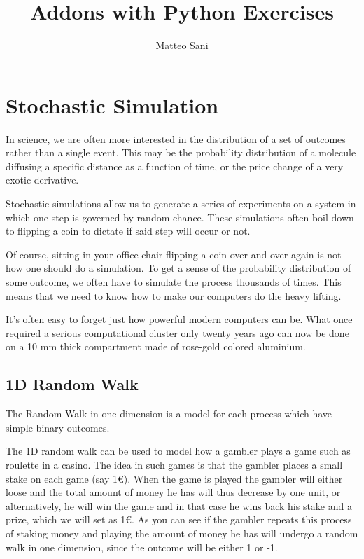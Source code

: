 \documentclass[12pt,a4paper]{article}
\title{Addons with Python Exercises}
\author{Matteo Sani}
\begin{document}
\maketitle

\section{Stochastic Simulation}
In science, we are often more interested in the distribution of a set of outcomes rather than a single event. This may be the probability distribution of a molecule diffusing a specific distance as a function of time, or the price change of a very exotic derivative.

Stochastic simulations allow us to generate a series of experiments on a system in which one step is governed by random chance. These simulations often boil down to flipping a coin to dictate if said step will occur or not.

Of course, sitting in your office chair flipping a coin over and over again is not how one should do a simulation. To get a sense of the probability distribution of some outcome, we often have to simulate the process thousands of times. This means that we need to know how to make our computers do the heavy lifting.

It's often easy to forget just how powerful modern computers can be. What once required a serious computational cluster only twenty years ago can now be done on a 10 mm thick compartment made of rose-gold colored aluminium. 


\subsection{1D Random Walk}
The Random Walk in one dimension is a model for each process which have simple binary outcomes.

The 1D random walk can be used to model how a gambler plays a game such as roulette in a casino. The idea in such games is that the gambler places a small stake on each game (say 1€). When the game is played the gambler will either loose and the total amount of money he has will thus decrease by one unit, or alternatively, he will win the game and in that case he wins back his stake and a prize, which we will set as 1€. As you can see if the gambler repeats this process of staking money and playing the amount of money he has will undergo a random walk in one dimension, since the outcome will be either 1 or -1.
\end{document}
